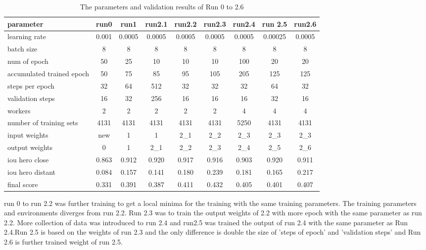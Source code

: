 \documentclass[paper=a4, fontsize=11pt]{scrartcl} %
\numberwithin{equation}{section} %
\numberwithin{figure}{section} %
\numberwithin{table}{section} %
\begin{document}
\begin{enumerate}
\begin{itemize}
{\begin{table}
	\begin{center}
		\begin{tabular}{ l | c | c | c | c | c | c | c| c }
		\hline
		parameter & run0 & run1 & run2.1 & run2.2 & run2.3 & run2.4 & run 2.5 & run2.6\\ \hline
		learning rate & 0.001 & 0.0005 & 0.0005 & 0.0005 & 0.0005 & 0.0005& 0.00025& 0.0005\\ \hline
		batch size    & 8 & 8 & 8 & 8 & 8 & 8  & 8 & 8\\ \hline
		num of epoch  & 50 & 25 & 10  &  10 &  10 & 100 & 20 & 20\\ \hline
		accumulated trained epoch & 50 & 75 & 85 & 95  & 105 & 205 & 125 & 125\\ \hline
		steps per epoch & 32 & 64 & 512 & 32 & 32 & 32 & 64 & 32\\ \hline
		validation steps & 16 & 32 & 256 & 16 & 16 & 16 & 32 & 16\\ \hline
		workers & 2 & 2 & 2 & 2 & 2 & 4 & 4 & 4 \\ \hline
		number of training sets & 4131 & 4131 & 4131 & 4131 & 4131 & 5250 & 4131 & 4131\\ \hline
		input weights & new & 1 & 1 & 2\_1 & 2\_2  & 2\_3 & 2\_3 & 2\_3\\ \hline
		output weights & 0 & 1 & 2\_1 & 2\_2 & 2\_3 & 2\_4 & 2\_5 & 2\_6\\
		\hline \hline
		iou hero close &0.863 & 0.912 & 0.920 & 0.917 & 0.916 & 0.903 & 0.920 & 0.911\\ \hline	  
		iou hero distant & 0.084 & 0.157 & 0.141 & 0.180 & 0.239 & 0.181 & 0.165 & 0.217\\ \hline
		final score & 0.331& 0.391 & 0.387 & 0.411 & 0.432 & 0.405 & 0.401 & 0.407\\
		\hline
		\end{tabular}
		\caption{The parameters and validation results of Run 0 to 2.6}
		\label{tab:parameters2}
	\end{center}
\end{table}
run 0 to run 2.2 was further training to get a local minima for the training with the same training parameters. The training parameters and environments diverges from run 2.2. Run 2.3 was to train the output weights of 2.2 with more epoch with the same parameter as run 2.2. More collection of data was introduced to run 2.4 and run2.5 was trained the output of run 2.4 with the same parameter as Run 2.4.Run 2.5 is based on the weights of run 2.3 and the only difference is double the size of 'steps of epoch' and 'validation steps' and Run 2.6 is further trained weight of run 2.5.
}
\end{itemize}
\end{enumerate}
\end{document}
